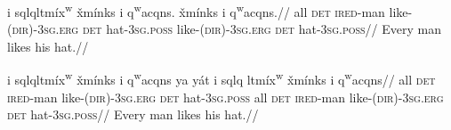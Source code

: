 \a\begingl[glhangrightskip=1]
 {i\textglotstop }
{sq\textschwa lq\textschwa ltm\'ix\textsuperscript{w}} {\v{x}m\'inks}
{i\textglotstop } {q\textsuperscript{w}acqns.} {\v{x}m\'inks}
{i\textglotstop } {q\textsuperscript{w}acqns.}//
\glb all \textsc{det} \textsc{ired}-man like-\textsc{(dir)-3sg.erg}
\textsc{det} hat-\textsc{3sg.poss} like-\textsc{(dir)-3sg.erg}
\textsc{det} hat-\textsc{3sg.poss}// \glft Every man likes his hat.//
\endgl

\a\begingl
{} {i\textglotstop }
{sq\textschwa lq\textschwa ltm\'ix\textsuperscript{w}} {\v{x}m\'inks}
{i\textglotstop } {q\textsuperscript{w}acqns} {ya\textrevglotstop
y\'a\textrevglotstop t} {i\textglotstop } {sq\textschwa lq\textschwa
ltm\'ix\textsuperscript{w}} {\v{x}m\'inks} {i\textglotstop }
{q\textsuperscript{w}acqns}//
\glb all \textsc{det} \textsc{ired}-man like-\textsc{(dir)-3sg.erg}
\textsc{det} hat-\textsc{3sg.poss} all \textsc{det} \textsc{ired}-man
like-\textsc{(dir)-3sg.erg} \textsc{det} hat-\textsc{3sg.poss}// \glft
Every man likes his hat.//
\endgl
\xe

%
